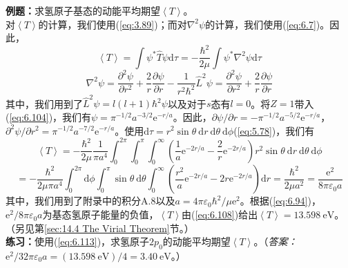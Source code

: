     \begin{examplebox}
        \textbf{例题：}求氢原子基态的动能平均期望$\left\langle T \right\rangle$。
        \\

        对$\left\langle T \right\rangle$的计算，我们使用(\ref{eq:3.89})；而对$\nabla^2\psi$的计算，我们使用(\ref{eq:6.7})。因此，
        \begin{equation*}
            \left\langle T \right\rangle = \int\psi^{\ast}\hat{T}\psi\mathrm{d}\tau = -\frac{\hbar^2}{2\mu}\int\psi^{\ast}\nabla^2\psi\mathrm{d}\tau
        \end{equation*}
        \begin{equation*}
            \nabla^2\psi = \frac{\partial^2\psi}{\partial r^2} + \frac{2}{r}\frac{\partial\psi}{\partial r} - \frac{1}{r^2\hbar^2}\hat{L}^2\psi = \frac{\partial^2\psi}{\partial r^2} + \frac{2}{r}\frac{\partial\psi}{\partial r}
        \end{equation*}
        其中，我们用到了$\hat{L}^2\psi = l\left(l+1\right)\hbar^2\psi$以及对于$s$态有$l=0$。将$Z=1$带入(\ref{eq:6.104})，我们有$\psi = \pi^{-1/2}a^{-3/2}\mathrm{e}^{-r/a}$。因此，$\partial\psi/\partial r = -\pi^{-1/2}a^{-5/2}\mathrm{e}^{-r/a}$，$\partial^2\psi/\partial r^2 = \pi^{-1/2}a^{-7/2}\mathrm{e}^{-r/a}$。使用$\mathrm{d}\tau = r^2\sin\theta\:\mathrm{d}r\:\mathrm{d}\theta\:\mathrm{d}\phi$(\ref{eq:5.78})，我们有
        \begin{equation*}
            \left\langle T \right\rangle = -\frac{\hbar^2}{2\mu}\frac{1}{\pi a^4}\int_{0}^{2\pi}\int_{0}^{\pi}\int_{0}^{\infty}\left(\frac{1}{a}\mathrm{e}^{-2r/a} - \frac{2}{r}\mathrm{e}^{-2r/a}\right)r^2\sin\theta\:\mathrm{d}r\:\mathrm{d}\theta\:\mathrm{d}\phi
        \end{equation*}
        \begin{equation*}
            = -\frac{\hbar^2}{2\mu\pi a^4}\int_{0}^{2\pi}\mathrm{d}\phi\int_{0}^{\pi}\sin\theta\:\mathrm{d}\theta\int_{0}^{\infty}\left(\frac{r^2}{a}\mathrm{e}^{-2r/a} - 2r\mathrm{e}^{-2r/a}\right)\mathrm{d}r = \frac{\hbar^2}{2\mu a^2} = \frac{\mathrm{e}^2}{8\pi\varepsilon_0a}
        \end{equation*}
        其中，我们用到了附录中的积分A.8以及$a = 4\pi\varepsilon_0\hbar^2/\mu\mathrm{e}^2$。根据(\ref{eq:6.94})，$\mathrm{e}^2/8\pi\varepsilon_0a$为基态氢原子能量的负值，$\left\langle T \right\rangle$由(\ref{eq:6.108})给出$\left\langle T \right\rangle = 13.598 \: \mathrm{eV}$。（另见第\ref{sec:14.4 The Virial Theorem}节。）
        \\

        \textbf{练习：}使用(\ref{eq:6.113})，求氢原子$2p_0$的动能平均期望$\left\langle T \right\rangle$。（\textit{答案：}$\mathrm{e}^2/32\pi\varepsilon_0a = \left(13.598 \: \mathrm{eV}\right) /4 = 3.40 \: \mathrm{eV}$。）
    \end{examplebox}

